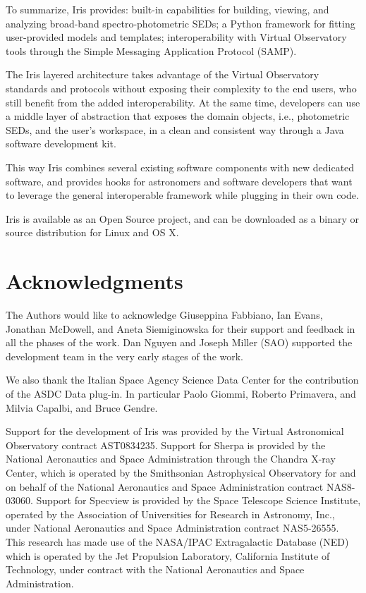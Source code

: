 \documentclass[preprint,authoryear,5p]{elsarticle}
\begin{document}
To summarize, Iris provides: built-in capabilities for building, viewing, and
analyzing broad-band spec\-tro-pho\-to\-met\-ric SEDs; a Python framework for fitting
user-pro\-vid\-ed models and templates; interoperability with Virtual Observatory
tools through the Simple Messaging Application Protocol (SAMP).

The Iris layered architecture takes advantage of the Virtual Observatory
standards and protocols without exposing their complexity to the end users,
who still benefit from the added interoperability. At the same time, developers
can use a middle layer of abstraction that exposes the domain objects, i.e.,
photometric SEDs, and the user's workspace, in a clean and consistent
way through a Java software development kit.

\begin{sloppypar}
This way Iris combines several existing software components with new dedicated
software, and provides hooks for astronomers and software developers that want to
leverage the general interoperable framework while plugging in their own code.
\end{sloppypar}

Iris is available as an Open Source project, and can be downloaded as a binary
or source distribution for Linux and OS X.


\section*{Acknowledgments}
\begin{sloppypar}
The Authors would like to acknowledge Giuseppina Fabbiano, Ian Evans,
Jonathan McDowell, and Aneta Siemiginowska
for their support and feedback in all the phases of the work.
Dan Nguyen and Joseph Miller (SAO) supported the
development team in the very early stages of the work.
\end{sloppypar}

We also thank the Italian Space Agency Science Data Center for the contribution
of the ASDC Data plug-in. In particular Paolo Giommi, Roberto Primavera, and
Milvia Capalbi, and Bruce Gendre.

Support for the development of Iris was provided by
the Virtual Astronomical Observatory contract AST0834235. Support for Sherpa is
provided by the National Aeronautics and Space Administration through the
Chandra X-ray Center, which is operated by the Smithsonian Astrophysical
Observatory for and on behalf of the National Aeronautics and Space
Administration contract NAS8-03060.  Support for Specview is provided by the
Space Telescope Science Institute, operated by the Association of Universities
for Research in Astronomy, Inc., under National Aeronautics and Space
Administration contract NAS5-26555. This research has made use of the NASA/IPAC
Extragalactic Database (NED) which is operated by the Jet Propulsion Laboratory,
California Institute of Technology, under contract with the National Aeronautics
and Space Administration.
\end{document}
